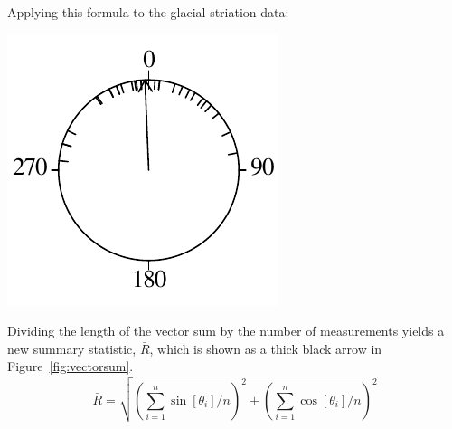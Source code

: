 Applying this formula to the glacial striation data:

\noindent\begin{minipage}[t][][b]{.2\textwidth}
\includegraphics[width=\textwidth]{../figures/circle3.pdf}\medskip
\end{minipage}
\begin{minipage}[t][][t]{.8\textwidth}
  \label{fig:circle3}
\end{minipage}

Dividing the length of the vector sum by the number of measurements
yields a new summary statistic, $\bar{R}$, which is shown as a thick
black arrow in Figure~\ref{fig:vectorsum}.
\begin{equation}
  \bar{R} = \sqrt{\left(\sum_{i=1}^{n} \sin[\theta_i]/n\right)^2 +
    \left( \sum_{i=1}^{n}\cos[\theta_i]/n \right)^2}
  \label{eq:circularR}
\end{equation}

